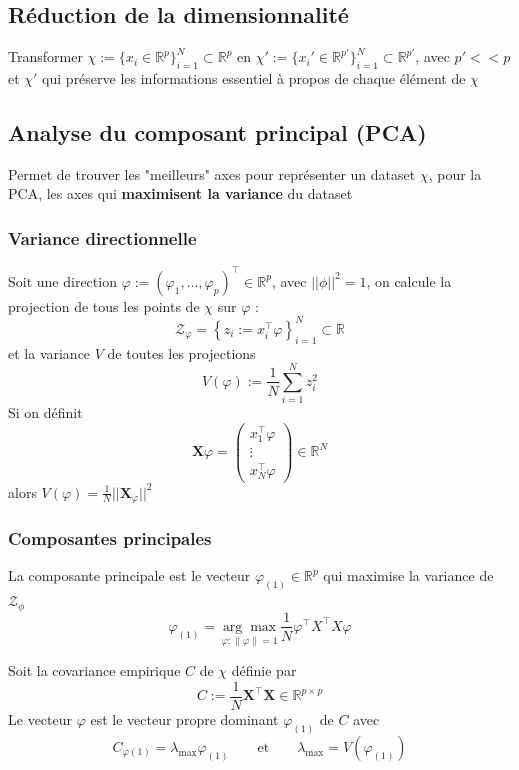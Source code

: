 \documentclass[12pt,a4paper]{article}
\begin{document}
\subsection{Réduction de la dimensionnalité}

Transformer $\chi := \{x_i \in \mathbb{R}^p\}_{i=1}^N \subset \mathbb{R}^p$ en $\chi ' := \{x_i' \in \mathbb{R}^{p'}\}_{i=1}^N \subset \mathbb{R}^{p'}$, avec $p'<<p$ et $\chi'$ qui préserve les informations essentiel à propos de chaque élément de $\chi$

\subsection{Analyse du composant principal (PCA)}

Permet de trouver les "meilleurs" axes pour représenter un dataset $\chi$, pour la PCA, les axes qui \textbf{maximisent la variance} du dataset

\subsubsection{Variance directionnelle}

Soit une direction $\varphi := (\varphi_1,\dots,\varphi_p)^\top \in \mathbb{R}^p$, avec $||\phi||^2 = 1$, on calcule la projection de tous les points de $\chi$ sur $\varphi$ :
$$\mathcal{Z}_{\varphi} = \left\{ z_i := x_i^{\top} \varphi \right\}_{i=1}^{N} \subset \mathbb{R}$$
et la variance $V$ de toutes les projections
$$V(\varphi) := \frac{1}{N} \sum_{i=1}^N z_i^2$$
Si on définit
$$\mathbf{X} \varphi = \begin{pmatrix}
x_1^\top \varphi \\
\vdots \\
x_N^\top \varphi
\end{pmatrix} \in \mathbb{R}^N$$
alors $V(\varphi) = \frac{1}{N}||\mathbf{X}_\varphi||^2$

\subsubsection{Composantes principales}

La composante principale est le vecteur $\varphi_{(1)} \in \mathbb{R}^p$ qui maximise la variance de $\mathcal{Z}_\phi$
$$\varphi_{(1)} = \underset{\varphi: \|\varphi\|=1}{\arg \max} \frac{1}{N} \varphi^\top X^\top X \varphi$$

Soit la covariance empirique $C$ de $\chi$ définie par
$$C := \frac{1}{N} \mathbf{X}^\top \mathbf{X} \in \mathbb{R}^{p\times p}$$
Le vecteur $\varphi$ est le vecteur propre dominant $\varphi_{(1)}$ de $C$ avec
$$C_{\varphi{(1)}} = \lambda_\text{max} \varphi_{(1)} \qquad \text{et} \qquad \lambda_\text{max} = V(\varphi_{(1)})$$
\end{document}
